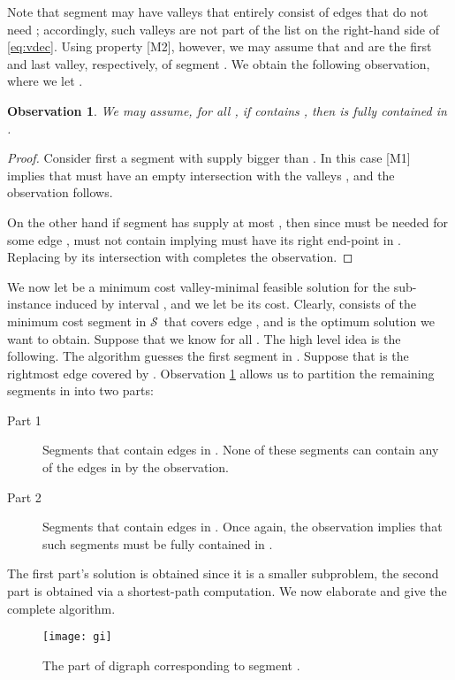 \documentclass[11pt]{article}
\newtheorem{observation}{Observation}
\newcommand{\ess}{\ensuremath{\mathcal{S}}}
\newcommand{\1}{\mathbb{1}}
\begin{document}
{Note that segment  may have valleys that entirely consist of 
edges that do not need ; accordingly, such valleys are not 
part of the list on the right-hand side of \eqref{eq:vdec}. 
Using property [M2], however, we may assume that
  and  are the first and last valley, 
respectively, of segment .
We obtain the following observation,  where we let . 

\begin{observation}\label{obs:part}
  We may assume,
  for all , if  contains ,
  then  is fully contained in . 
\end{observation}
\begin{proof}
  Consider first a segment  with supply bigger than .
  In this case [M1] implies that  must have an empty intersection with
  the valleys , and the observation
  follows.

  On the other hand if segment  has supply at most , then
  since  must be needed for some edge ,  must not contain
   implying  must have its right end-point in
  . Replacing  by its intersection with 
  completes the observation.
\end{proof}

We now let  be a minimum cost valley-minimal feasible
solution for the sub-instance induced by interval , and we let
 be its cost. Clearly,  consists of the
minimum cost segment in \ess\ that covers edge , and 
is the optimum solution we want to obtain. Suppose that we know
 for all . The high level idea is the
following. The algorithm guesses the first segment  in
. Suppose that  is the rightmost edge covered
by .  Observation \ref{obs:part} allows us to partition the
remaining segments in  into two parts:
\begin{description}
  \item[Part 1] Segments that contain edges in . None of these 
    segments can contain any of the edges in  by the observation.
  \item[Part 2] Segments that contain edges in . Once again,
    the observation implies that such segments must be fully
    contained in .
\end{description}
The first part's solution is obtained since it
is a smaller subproblem, the second part is obtained via a
shortest-path computation.  We now elaborate and give the complete
algorithm.


\begin{figure}[t]
\begin{center}
  \texttt{[image: gi]}
\end{center}
\caption{\label{fig:gi} The part of digraph  corresponding to segment
  .}
\end{figure}

}
\end{document}
